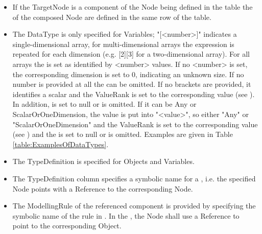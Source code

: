 \begin{itemize}
    \item If the \gls{TargetNode} is a component of the \gls{Node} being defined in the table the  of the composed Node are defined in the same row of the table. 
    \item The \gls{DataType} is only specified for Variables; "[<number>]" indicates a single-dimensional array, for multi-dimensional arrays the expression is repeated for each dimension (e.g. [2][3] for a two-dimensional array). For all arrays the  is set as identified by <number> values. If no <number> is set, the corresponding dimension is set to 0, indicating an unknown size. If no number is provided at all the  can be omitted. If no brackets are provided, it identifies a scalar  and the \gls{ValueRank} is set to the corresponding value (see \cite{UAPart3}). In addition,  is set to null or is omitted. If it can be Any or ScalarOrOneDimension, the value is put into "{<value>}", so either "{Any}" or "{ScalarOrOneDimension}" and the \gls{ValueRank} is set to the corresponding value (see \cite{UAPart3}) and the  is set to null or is omitted. Examples are given in Table \ref{table:ExamplesOfDataTypes}.
    \item The \gls{TypeDefinition} is specified for Objects and Variables.
    \item The \gls{TypeDefinition} column specifies a symbolic name for a , i.e. the specified Node points with a  Reference to the corresponding Node.
    \item The \gls{ModellingRule} of the referenced component is provided by specifying the symbolic name of the rule in . In the , the Node shall use a  Reference to point to the corresponding  Object.
\end{itemize}

